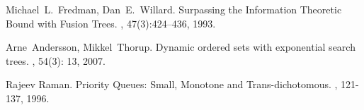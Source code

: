 \documentclass[11pt]{article}
\begin{document}


\begin{thebibliography}{42}

Michael~L.~Fredman, Dan~E.~Willard.
\newblock Surpassing the Information Theoretic Bound with Fusion Trees.
, 47(3):424--436, 1993.

Arne~Andersson, Mikkel~Thorup.
\newblock Dynamic ordered sets with exponential search trees.
, 54(3): 13, 2007.

Rajeev Raman.
\newblock Priority Queues: Small, Monotone and Trans-dichotomous.
, 121-137, 1996.

\end{thebibliography}
\end{document}
